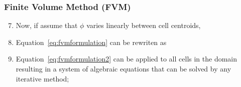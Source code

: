 \documentclass[10pt,compress]{beamer}
\begin{document}
\begin{frame}
 \frametitle{Finite Volume Method (FVM)} 

\begin{enumerate}
   \setcounter{enumi}{6}
     \item <1-> Now, if assume that $\phi$ varies linearly between cell centroids,
     \item <2-> Equation~\ref{eq:fvmformulation} can be rewriten as
     \item <3-> Equation~\ref{eq:fvmformulation2} can be applied to all cells in the domain resulting in a system of algebraic equations that can be solved by any iterative method;
      
\end{enumerate}  
 
\end{frame}
 
\end{document}
